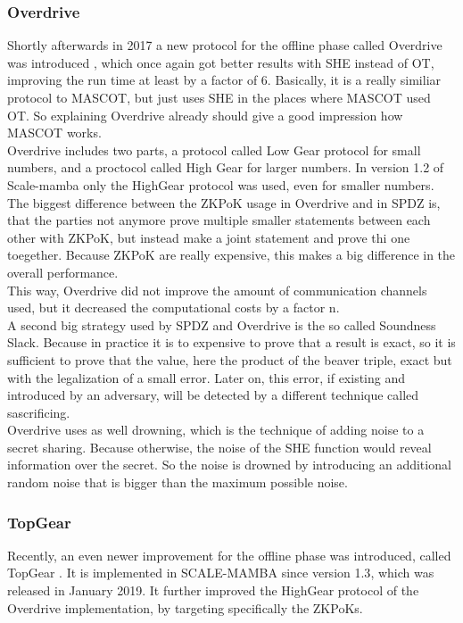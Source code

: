 \documentclass[english,runningheads,a4paper]{llncs}[2018/03/10]
\begin{document}
\subsubsection{Overdrive}
Shortly afterwards in 2017 a new protocol for the offline phase called Overdrive was introduced \cite{cryptoeprint:2017:1230}, which once again got better results with SHE instead of OT, improving the run time at least by a factor of 6. Basically, it is a really similiar protocol to MASCOT, but just uses SHE in the places where MASCOT used OT. So explaining Overdrive already should give a good impression how MASCOT works. \\
 Overdrive includes two parts, a protocol called Low Gear protocol for small numbers, and a proctocol called High Gear for larger numbers. In version 1.2 of Scale-mamba only the HighGear protocol was used, even for smaller numbers.\\

The biggest difference between the ZKPoK usage in Overdrive and in SPDZ is, that the parties not anymore prove multiple smaller statements between each other with ZKPoK, but instead make a joint statement and prove thi one toegether. Because ZKPoK are really expensive, this makes a big difference in the overall performance.\\
This way, Overdrive did not improve the amount of communication channels used, but it decreased the computational costs by a factor n.\\
A second big strategy used by SPDZ and Overdrive is the so called Soundness Slack. Because in practice it is to expensive to prove that a result is exact, so it is sufficient to prove that the value, here the product of the beaver triple, exact but with the legalization of a small error. Later on, this error, if existing and introduced by an adversary, will be detected by a different technique called sascrificing.\\
Overdrive uses as well drowning, which is the technique of adding noise to a secret sharing. Because otherwise, the noise of the SHE function would reveal information over the secret. So the noise is drowned by introducing an additional random noise that is bigger than the maximum possible noise.\\


\subsubsection{TopGear}
Recently, an even newer improvement for the offline phase was introduced, called TopGear \cite{cryptoeprint:2019:035}. It is implemented in SCALE-MAMBA since version 1.3\cite{ScaleMambaDocu}, which was released in January 2019. It further improved the HighGear protocol of the Overdrive implementation, by targeting specifically the ZKPoKs.
\end{document}
